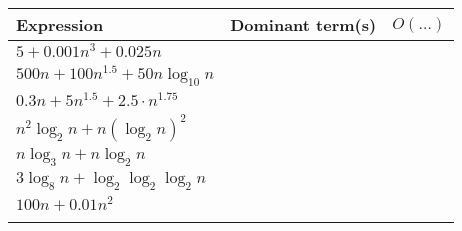 \documentclass[]{article}
\begin{document}
\begin{enumerate}
\begin{tabular}{|l|c|c|} \hline
Expression & Dominant term(s) &  
\hspace*{1mm} $O(\ldots)$ \hspace*{1mm}  \\ \hline
\begin{minipage}{50mm} \vspace*{1mm}
$5 + 0.001 n^{3} + 0.025 n$ \vspace*{1mm}
\end{minipage}
& & \\ \hline
\begin{minipage}{50mm} \vspace*{1mm}
$500 n + 100 n^{1.5} + 50 n\log_{10}n$ \vspace*{1mm}
\end{minipage}
& & \\ \hline
\begin{minipage}{50mm} \vspace*{1mm}
$0.3 n + 5 n^{1.5} + 2.5 \cdot n^{1.75}$ \vspace*{1mm}
\end{minipage}
& & \\ \hline
\begin{minipage}{50mm} \vspace*{1mm}
$n^{2} \log_{2}n + n (\log_{2} n )^{2}$ \vspace*{1mm}
\end{minipage}
& & \\ \hline
\begin{minipage}{50mm} \vspace*{1mm}
$n \log_{3} n  + n \log_{2}n$ \vspace*{1mm}
\end{minipage}
& \hspace*{25mm} & \\ \hline
\begin{minipage}{50mm} \vspace*{1mm}
$3 \log_{8}n + \log_{2} \log_{2} \log_{2} n$ \vspace*{1mm}
\end{minipage}
& & \\ \hline
\begin{minipage}{50mm} \vspace*{2mm}
$100n + 0.01n^{2}$ \vspace*{2mm}
\end{minipage}
& & \\ \hline
\begin{minipage}{50mm} \vspace*{2mm}

\end{minipage}
\end{tabular}
\end{enumerate}
\end{document}
